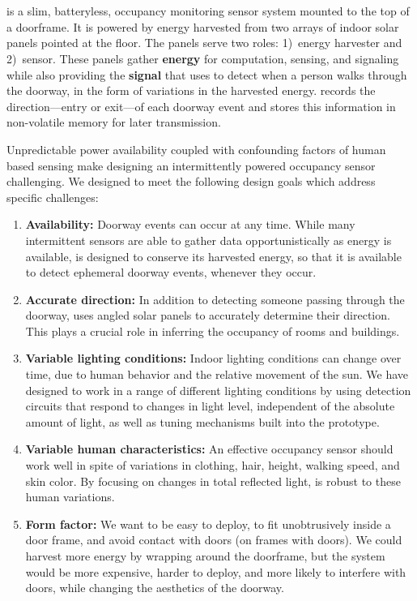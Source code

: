 \section{\sysname}
\label{sec:system}
\sysname is a slim, batteryless, occupancy monitoring sensor system mounted to the top of a doorframe.
It is powered by energy harvested from two arrays of indoor solar panels pointed at the floor.
The panels serve two roles: 1)~energy harvester and 2)~sensor.
These panels gather \textbf{energy} for computation, sensing, and signaling while also providing the \textbf{signal} that \sysname uses to detect when a person walks through the doorway, in the form of variations in the harvested energy.
\sysname records the direction---entry or exit---of each doorway event and stores this information in non-volatile memory for later transmission.


 Unpredictable power availability coupled with confounding factors of human based sensing make designing an intermittently powered occupancy sensor challenging.
We designed \sysname to meet the following design goals which address specific challenges:
\begin{enumerate}
	\item \textbf{Availability:} Doorway events can occur at any time.
	While many intermittent sensors are able to gather data opportunistically as energy is available, \sysname is designed to conserve its harvested energy, so that it is available to detect ephemeral doorway events, whenever they occur.
	\item \textbf{Accurate direction:} In addition to detecting someone passing through the doorway, \sysname uses angled solar panels to accurately determine their direction.
	This plays a crucial role in inferring the occupancy of rooms and buildings.
	\item \textbf{Variable lighting conditions:} Indoor lighting conditions can change over time, due to human behavior and the relative movement of the sun.
	We have designed \sysname to work in a range of different lighting conditions by using detection circuits that respond to changes in light level, independent of the absolute amount of light, as well as tuning mechanisms built into the prototype.
	\item \textbf{Variable human characteristics:} An effective occupancy sensor should work well in spite of variations in clothing, hair, height, walking speed, and skin color. By focusing on changes in total reflected light, \sysname is robust to these human variations.
	\item \textbf{Form factor:} We want \sysname to be easy to deploy, to fit unobtrusively inside a door frame, and avoid contact with doors (on frames with doors).
	We could harvest more energy by wrapping \sysname around the doorframe, but the system would be more expensive, harder to deploy, and more likely to interfere with doors, while changing the aesthetics of the doorway.
\end{enumerate}

